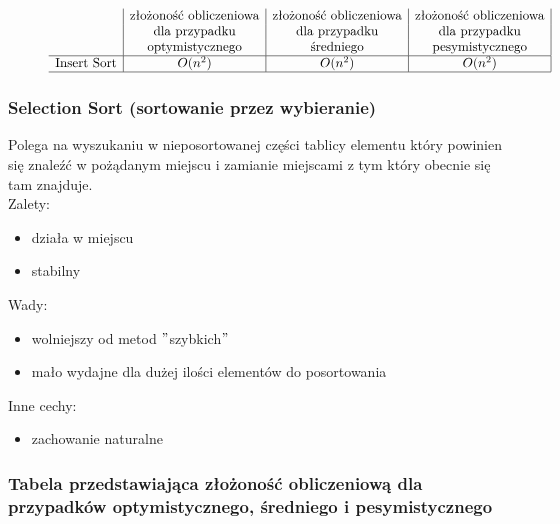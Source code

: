 \documentclass[polish,polish,a4paper]{article}
\begin{document}
\begin{spacing}{1.5}
	\begin{figure}[H]
		\begin{equation*}
		\begin{array}{l|c|c|c|}

		&$złożoność obliczeniowa$&$złożoność obliczeniowa$&$złożoność obliczeniowa$\\
		&$dla przypadku$&$dla przypadku$&$dla przypadku$\\
		&$optymistycznego$&$średniego$&$pesymistycznego$\\
		\hline
		$Insert Sort$&O(n^2)&O(n^2)&O(n^2)\\
		\hline
		\end{array}
		\end{equation*}
	\end{figure}
		
		\subsubsection*{Selection Sort (sortowanie przez wybieranie)}
		Polega na wyszukaniu w nieposortowanej części tablicy elementu który powinien się znaleźć w pożądanym miejscu i zamianie miejscami z tym który obecnie się tam znajduje.\\
		
	Zalety:
	\begin{itemize}
		\item działa w miejscu
		\item stabilny 
	\end{itemize}
	Wady:
	\begin{itemize}
		\item wolniejszy od metod $ " $szybkich$ " $
		\item mało wydajne dla dużej ilości elementów do posortowania
	\end{itemize}
	Inne cechy:
	\begin{itemize}
		\item zachowanie naturalne
	\end{itemize}
	
				\subsubsection*{Tabela przedstawiająca złożoność obliczeniową dla przypadków optymistycznego, średniego i pesymistycznego} 
	\begin{figure}[H]

		\begin{equation*}
		\begin{array}{l|c|c|c|}


\end{array}
\end{equation*}
\end{figure}
\end{spacing}
\end{document}
